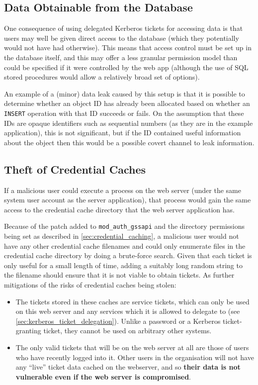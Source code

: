 \documentclass[12pt]{report}
\begin{document}
\subsection{Data Obtainable from the Database}
One consequence of using delegated Kerberos tickets for accessing data is that users may well be given direct access to the database (which they potentially would not have had otherwise). This means that access control must be set up in the database itself, and this may offer a less granular permission model than could be specified if it were controlled by the web app (although the use of SQL stored procedures would allow a relatively broad set of options).

An example of a (minor) data leak caused by this setup is that it is possible to determine whether an object ID has already been allocated based on whether an \texttt{INSERT} operation with that ID succeeds or fails. On the assumption that these IDs are opaque identifiers such as sequential numbers (as they are in the example application), this is not significant, but if the ID contained useful information about the object then this would be a possible covert channel to leak information.

\subsection{Theft of Credential Caches}
\label{sec:theft_of_credential_caches}
If a malicious user could execute a process on the web server (under the same system user account as the server application), that process would gain the same access to the credential cache directory that the web server application has.

Because of the patch added to \verb+mod_auth_gssapi+ and the directory permissions being set as described in \autoref{sec:credential_caching}, a malicious user would not have any other credential cache filenames and could only enumerate files in the credential cache directory by doing a brute-force search. Given that each ticket is only useful for a small length of time, adding a suitably long random string to the filename should ensure that it is not viable to obtain tickets. As further mitigations of the risks of credential caches being stolen:

\begin{itemize}
\item
  The tickets stored in these caches are service tickets, which can only be used on this web server and any services which it is allowed to delegate to (see \autoref{sec:kerberos_ticket_delegation}). Unlike a password or a Kerberos ticket-granting ticket, they cannot be used on arbitrary other systems.
\item
  The only valid tickets that will be on the web server at all are those of users who have recently logged into it. Other users in the organisation will not have any ``live'' ticket data cached on the webserver, and so \textbf{their data is not vulnerable even if the web server is compromised}.
\end{itemize}
\end{document}

